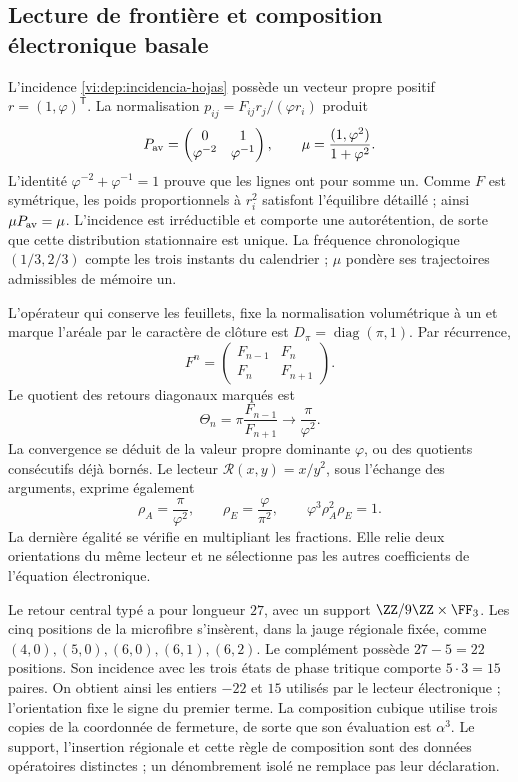 \subsection{Lecture de frontière et composition électronique basale}
\label{vi:dep:basal}

L’incidence \eqref{vi:dep:incidencia-hojas} possède un vecteur propre
positif \(r=(1,\varphi)^{\mathsf T}\). La normalisation
\(p_{ij}=F_{ij}r_j/(\varphi r_i)\) produit
\[
 P_{\rm av}=\begin{pmatrix}0&1\\\varphi^{-2}&\varphi^{-1}\end{pmatrix},
 \qquad \mu=\frac{(1,\varphi^2)}{1+\varphi^2}.
\]
L’identité \(\varphi^{-2}+\varphi^{-1}=1\) prouve que les lignes
ont pour somme un. Comme \(F\) est symétrique, les poids proportionnels à
\(r_i^2\) satisfont l’équilibre détaillé ; ainsi \(\mu P_{\rm av}=\mu\).
L’incidence est irréductible et comporte une autorétention, de sorte que
cette distribution stationnaire est unique. La fréquence chronologique
\((1/3,2/3)\) compte les trois instants du calendrier ; \(\mu\)
pondère ses trajectoires admissibles de mémoire un.

L’opérateur qui conserve les feuillets, fixe la normalisation volumétrique
à un et marque l’aréale par le caractère de clôture est
\(D_\pi=\operatorname{diag}(\pi,1)\). Par récurrence,
\[
 F^n=\begin{pmatrix}F_{n-1}&F_n\\F_n&F_{n+1}\end{pmatrix}.
\]
Le quotient des retours diagonaux marqués est
\[
 \Theta_n=\pi\frac{F_{n-1}}{F_{n+1}}
 \longrightarrow\frac{\pi}{\varphi^2}.
\]
La convergence se déduit de la valeur propre dominante \(\varphi\), ou des
quotients consécutifs déjà bornés. Le lecteur
\(\mathcal R(x,y)=x/y^2\), sous l’échange des arguments,
exprime également
\begin{equation}
 \rho_A=\frac{\pi}{\varphi^2},\qquad
 \rho_E=\frac{\varphi}{\pi^2},\qquad
 \varphi^3\rho_A^2\rho_E=1.
 \label{vi:dep:dos-orientaciones}
\end{equation}
La dernière égalité se vérifie en multipliant les fractions.
Elle relie deux orientations du même lecteur et ne sélectionne pas les
autres coefficients de l’équation électronique.

Le retour central typé a pour longueur \(27\), avec un support
\(\ZZ/9\ZZ\times\FF_3\). Les cinq positions de la microfibre
s’insèrent, dans la jauge régionale fixée, comme
\((4,0),(5,0),(6,0),(6,1),(6,2)\).
Le complément possède \(27-5=22\) positions. Son incidence avec les
trois états de phase tritique comporte \(5\cdot3=15\) paires.
On obtient ainsi les entiers \(-22\) et \(15\) utilisés par le
lecteur électronique ; l’orientation fixe le signe du premier terme.
La composition cubique utilise trois copies de la coordonnée de fermeture,
de sorte que son évaluation est \(\alpha^3\). Le support, l’insertion
régionale et cette règle de composition sont des données opératoires distinctes ;
un dénombrement isolé ne remplace pas leur déclaration.

